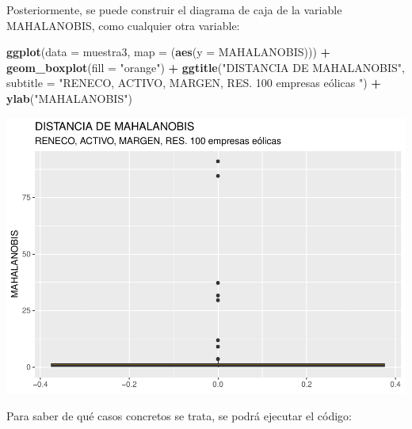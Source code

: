 \documentclass[
]{book}
\newenvironment{Shaded}{\begin{snugshade}}{\end{snugshade}}
\newcommand{\AttributeTok}[1]{\textcolor[rgb]{0.13,0.29,0.53}{#1}}
\newcommand{\FloatTok}[1]{\textcolor[rgb]{0.00,0.00,0.81}{#1}}
\newcommand{\FunctionTok}[1]{\textcolor[rgb]{0.13,0.29,0.53}{\textbf{#1}}}
\newcommand{\NormalTok}[1]{#1}
\newcommand{\OtherTok}[1]{\textcolor[rgb]{0.56,0.35,0.01}{#1}}
\newcommand{\SpecialCharTok}[1]{\textcolor[rgb]{0.81,0.36,0.00}{\textbf{#1}}}
\newcommand{\StringTok}[1]{\textcolor[rgb]{0.31,0.60,0.02}{#1}}
\let\Oldincludegraphics\includegraphics
\renewcommand{\includegraphics}[2][]{%
  \Oldincludegraphics[#1]{#2}%
}
\begin{document}
Posteriormente, se puede construir el diagrama de caja de la variable MAHALANOBIS, como cualquier otra variable:

\begin{Shaded}
\begin{Highlighting}[]
\FunctionTok{ggplot}\NormalTok{(}\AttributeTok{data =}\NormalTok{ muestra3, }\AttributeTok{map =}\NormalTok{ (}\FunctionTok{aes}\NormalTok{(}\AttributeTok{y =}\NormalTok{ MAHALANOBIS))) }\SpecialCharTok{+}
    \FunctionTok{geom\_boxplot}\NormalTok{(}\AttributeTok{fill =} \StringTok{"orange"}\NormalTok{) }\SpecialCharTok{+}
    \FunctionTok{ggtitle}\NormalTok{(}\StringTok{"DISTANCIA DE MAHALANOBIS"}\NormalTok{,}
            \AttributeTok{subtitle =} \StringTok{"RENECO, ACTIVO, MARGEN, RES. 100 empresas eólicas "}\NormalTok{) }\SpecialCharTok{+}
    \FunctionTok{ylab}\NormalTok{(}\StringTok{"MAHALANOBIS"}\NormalTok{)}
\end{Highlighting}
\end{Shaded}

\includegraphics{_main_files/figure-latex/unnamed-chunk-190-1.pdf}

Para saber de qué casos concretos se trata, se podrá ejecutar el código:

\begin{Shaded}
\end{Shaded}
\end{document}
